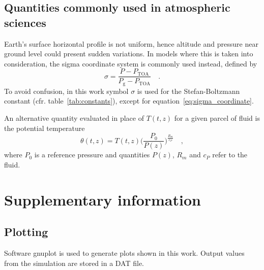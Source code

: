 \documentclass[a4paper,10pt,twocolumn,\classoptions]{article}
\newcommand{\PTOA}{P_\text{TOA}}
\begin{document}
\subsection{Quantities commonly used in atmospheric sciences}
\label{sec:Quantities commonly used in atmospheric sciences}
Earth's surface horizontal profile is not uniform, hence altitude and pressure near ground level could present sudden variations. In models where this is taken into consideration, the sigma coordinate system is commonly used instead, defined by
\begin{equation}
  \label{eq:sigma_coordinate}
  \sigma = \frac{P - \PTOA}{P_\text{g} - \PTOA}
  \quad .
\end{equation}
To avoid confusion, in this work symbol $\sigma$ is used for the Stefan-Boltzmann constant (cfr. table~\ref{tab:constants}), except for equation~\eqref{eq:sigma_coordinate}.

An alternative quantity evaluated in place of $T(t,z)$ for a given parcel of fluid is the potential temperature
\begin{equation}
  \label{eq:potential_temperature}
  \theta(t,z) = T(t,z) \bigg( \frac{P_0}{P(z)} \bigg)^\frac{R_m}{c_P}
  \quad ,
\end{equation}
where $P_0$ is a reference pressure and quantities $P(z)$, $R_m$ and $c_P$ refer to the fluid.



\section{Supplementary information}



\subsection{Plotting}
\label{sec:Plotting}
Software gnuplot is used to generate plots shown in this work. Output values from the simulation are stored in a DAT file.



\newpage
\printbibliography[heading=bibintoc]
\end{document}
